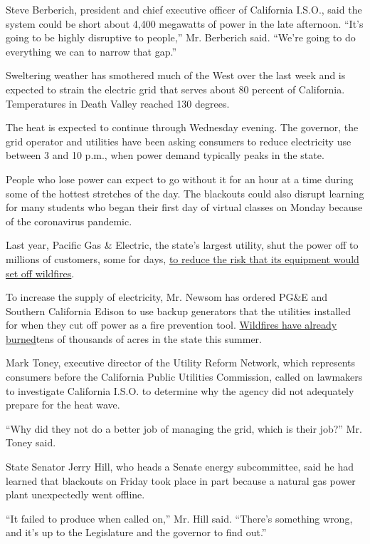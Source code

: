 Steve Berberich, president and chief executive officer of California
I.S.O., said the system could be short about 4,400 megawatts of power in
the late afternoon. ``It's going to be highly disruptive to people,''
Mr. Berberich said. ``We're going to do everything we can to narrow that
gap.''

Sweltering weather has smothered much of the West over the last week and
is expected to strain the electric grid that serves about 80 percent of
California. Temperatures in Death Valley reached 130 degrees.

The heat is expected to continue through Wednesday evening. The
governor, the grid operator and utilities have been asking consumers to
reduce electricity use between 3 and 10 p.m., when power demand
typically peaks in the state.

People who lose power can expect to go without it for an hour at a time
during some of the hottest stretches of the day. The blackouts could
also disrupt learning for many students who began their first day of
virtual classes on Monday because of the coronavirus pandemic.

Last year, Pacific Gas \& Electric, the state's largest utility, shut
the power off to millions of customers, some for days,
\href{https://www.nytimes3xbfgragh.onion/2019/10/12/business/pge-california-outage.html}{to
reduce the risk that its equipment would set off wildfires}.

To increase the supply of electricity, Mr. Newsom has ordered PG\&E and
Southern California Edison to use backup generators that the utilities
installed for when they cut off power as a fire prevention tool.
\href{https://www.nytimes3xbfgragh.onion/2020/08/19/us/california-wildfires-vacaville.html}{Wildfires
have already burned}tens of thousands of acres in the state this summer.

Mark Toney, executive director of the Utility Reform Network, which
represents consumers before the California Public Utilities Commission,
called on lawmakers to investigate California I.S.O. to determine why
the agency did not adequately prepare for the heat wave.

``Why did they not do a better job of managing the grid, which is their
job?'' Mr. Toney said.

State Senator Jerry Hill, who heads a Senate energy subcommittee, said
he had learned that blackouts on Friday took place in part because a
natural gas power plant unexpectedly went offline.

``It failed to produce when called on,'' Mr. Hill said. ``There's
something wrong, and it's up to the Legislature and the governor to find
out.''

